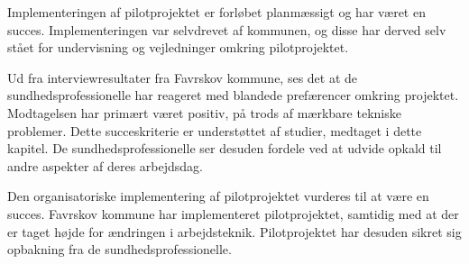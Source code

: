 Implementeringen af pilotprojektet er forløbet planmæssigt og har været en succes. Implementeringen var selvdrevet af kommunen, og disse har derved selv stået for undervisning og  vejledninger omkring pilotprojektet.

Ud fra interviewresultater fra Favrskov kommune, ses det at de sundhedsprofessionelle har reageret med blandede prefærencer omkring projektet. Modtagelsen har primært været positiv, på trods af mærkbare tekniske problemer. Dette succeskriterie er understøttet af studier, medtaget i dette kapitel. De sundhedsprofessionelle ser desuden fordele ved at udvide opkald til andre aspekter af deres arbejdsdag. 

Den organisatoriske implementering af pilotprojektet vurderes til at være en succes. Favrskov kommune har implementeret pilotprojektet, samtidig med at der er taget højde for ændringen i arbejdsteknik. Pilotprojektet har desuden sikret sig opbakning fra de sundhedsprofessionelle. 

